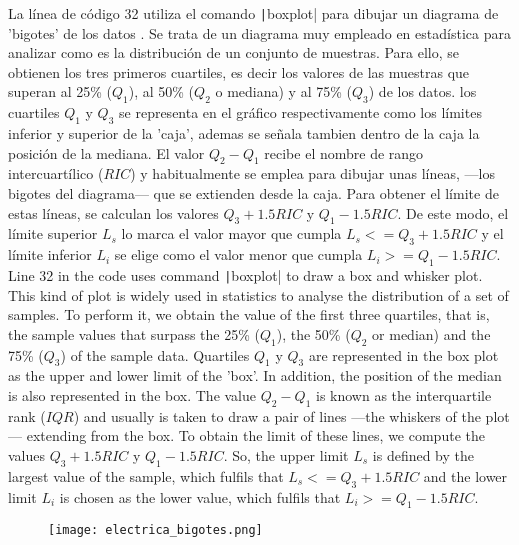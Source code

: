 \begin{paracol}{2}
La línea de código 32 utiliza el comando \texttt|boxplot| para dibujar un diagrama de 'bigotes' de los datos . Se trata de un diagrama muy empleado en estadística para analizar como es la distribución de un conjunto de muestras. Para ello, se obtienen los tres primeros cuartiles, es decir los valores de las muestras que superan al 25\% ($Q_1$), al 50\% ($Q_2$ o mediana) y al 75\% ($Q_3$) de los datos. los cuartiles $Q_1$ y $Q_3$ se representa en el gráfico respectivamente como los límites inferior y superior de la 'caja', ademas se señala tambien dentro de la caja la posición de la mediana. El valor $Q_2-Q_1$ recibe el nombre de rango intercuartílico ($RIC$) y habitualmente se emplea para dibujar unas líneas, ---los bigotes del diagrama--- que se extienden desde la caja. Para obtener el límite de estas líneas, se calculan los valores $Q_3+1.5RIC$ y $Q_1-1.5RIC$. De este modo, el límite superior $L_s$ lo marca el valor mayor que cumpla $L_s <= Q_3+1.5RIC$ y el límite inferior $L_i$ se elige como el valor menor que cumpla $L_i >= Q_1-1.5RIC$.
\switchcolumn
Line 32 in the code uses command \texttt|boxplot| to draw a box and whisker plot. This kind of plot is widely used in statistics to analyse the distribution of a set of samples. To perform it, we obtain the value of the first three quartiles, that is, the sample values that surpass the 25\% ($Q_1$), the 50\% ($Q_2$ or median) and the 75\% ($Q_3$) of the sample data. Quartiles $Q_1$ y $Q_3$ are represented in the box plot as the upper and lower limit of the 'box'. In addition, the position of the median is also represented in the box. The value $Q_2-Q_1$ is known as the interquartile rank ($IQR$) and usually is taken to draw a pair of lines ---the whiskers of the plot--- extending from the box. To obtain the limit of these lines, we compute the values $Q_3+1.5RIC$ y $Q_1-1.5RIC$. So, the upper limit $L_s$ is defined by the largest value of the sample, which fulfils that $L_s <= Q_3+1.5RIC$ and the lower limit $L_i$  is chosen as the lower value, which fulfils that $L_i >= Q_1-1.5RIC$.   
\end{paracol}
\begin{figure}
	\centering
	\texttt{[image: electrica\_bigotes.png]}
	\label{fig:datab}
\end{figure}

